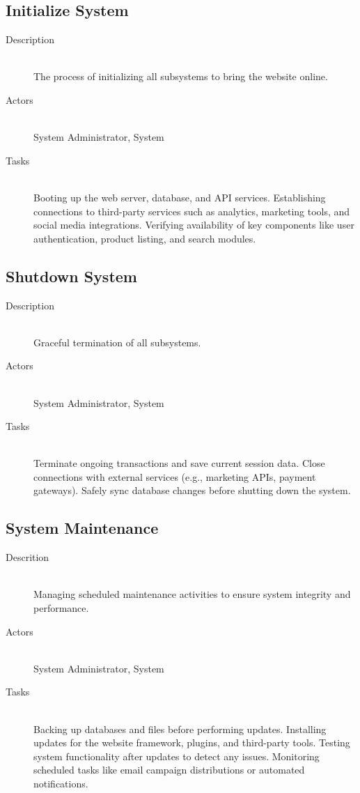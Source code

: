 \documentclass[twoside,a4paper,journal]{IEEEtran}
\begin{document}
\subsection{Initialize System}
\begin{description}
  \item[Description] \hfill \\
    The process of initializing all subsystems to bring the website online.
  \item[Actors] \hfill \\
    System Administrator, System
  \item[Tasks] \hfill \\
    Booting up the web server, database, and API services.
    Establishing connections to third-party services such as analytics,
    marketing tools, and social media integrations.
    Verifying availability of key components like user authentication, product
    listing, and search modules.
\end{description}

\subsection{Shutdown System}
\begin{description}
  \item[Description] \hfill \\
    Graceful termination of all subsystems.
  \item[Actors] \hfill \\
    System Administrator, System
  \item[Tasks] \hfill \\
    Terminate ongoing transactions and save current session data.
    Close connections with external services (e.g., marketing APIs, payment
    gateways). Safely sync database changes before shutting down the system.
\end{description}

\subsection{System Maintenance}
\begin{description}
  \item[Descrition] \hfill \\
    Managing scheduled maintenance activities to ensure system integrity and
    performance.
  \item[Actors] \hfill \\
    System Administrator, System
  \item[Tasks] \hfill \\
    Backing up databases and files before performing updates.
    Installing updates for the website framework, plugins, and third-party
    tools.
    Testing system functionality after updates to detect any issues.
    Monitoring scheduled tasks like email campaign distributions or automated
    notifications.
\end{description}
\end{document}
